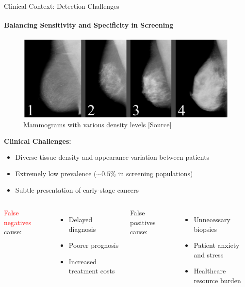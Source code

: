\documentclass[8pt,aspectratio=169,xcolor=dvipsnames]{beamer}
\begin{document}
\begin{frame}{Clinical Context: Detection Challenges}
    \framesubtitle{Balancing Sensitivity and Specificity in Screening}
    
\begin{figure}
    \centering
    \includegraphics[width=0.5\linewidth]{dense.png}
    \caption{Mammograms with various density levels \href{https://www.mdpi.com/2313-433X/9/5/95}{[Source]}}
    \label{fig:enter-label}
\end{figure}
    \begin{center}
        \textbf{Clinical Challenges:}
        \begin{itemize}
            \item Diverse tissue density and appearance variation between patients
            \item Extremely low prevalence ($\sim 0.5\%$  in screening populations)
            \item Subtle presentation of early-stage cancers
        \end{itemize}
        
        \vspace{0.3cm}
        \begin{columns}[c]
            \textcolor{red}{False negatives} cause:
                \begin{itemize}
                    \item Delayed diagnosis 
                    \item Poorer prognosis
                    \item Increased treatment costs
                \end{itemize}
            
            \textcolor{OliveGreen}{False positives} cause:
                \begin{itemize}
                    \item Unnecessary biopsies
                    \item Patient anxiety and stress
                    \item Healthcare resource burden
                \end{itemize}
        \end{columns}
    \end{center}
 \end{frame}
\end{document}
